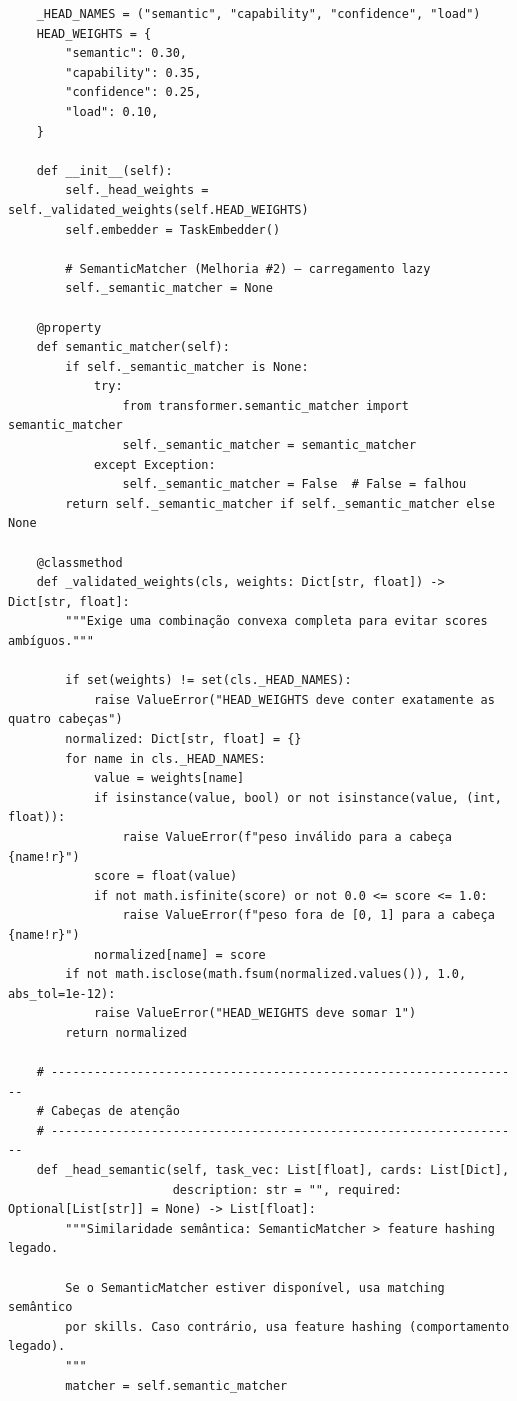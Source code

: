 \documentclass[12pt,openany,oneside,a4paper,brazil,chapter=TITLE]{abntex2}
\begin{document}
\begin{lstlisting}
    _HEAD_NAMES = ("semantic", "capability", "confidence", "load")
    HEAD_WEIGHTS = {
        "semantic": 0.30,
        "capability": 0.35,
        "confidence": 0.25,
        "load": 0.10,
    }

    def __init__(self):
        self._head_weights = self._validated_weights(self.HEAD_WEIGHTS)
        self.embedder = TaskEmbedder()

        # SemanticMatcher (Melhoria #2) — carregamento lazy
        self._semantic_matcher = None

    @property
    def semantic_matcher(self):
        if self._semantic_matcher is None:
            try:
                from transformer.semantic_matcher import semantic_matcher
                self._semantic_matcher = semantic_matcher
            except Exception:
                self._semantic_matcher = False  # False = falhou
        return self._semantic_matcher if self._semantic_matcher else None

    @classmethod
    def _validated_weights(cls, weights: Dict[str, float]) -> Dict[str, float]:
        """Exige uma combinação convexa completa para evitar scores ambíguos."""

        if set(weights) != set(cls._HEAD_NAMES):
            raise ValueError("HEAD_WEIGHTS deve conter exatamente as quatro cabeças")
        normalized: Dict[str, float] = {}
        for name in cls._HEAD_NAMES:
            value = weights[name]
            if isinstance(value, bool) or not isinstance(value, (int, float)):
                raise ValueError(f"peso inválido para a cabeça {name!r}")
            score = float(value)
            if not math.isfinite(score) or not 0.0 <= score <= 1.0:
                raise ValueError(f"peso fora de [0, 1] para a cabeça {name!r}")
            normalized[name] = score
        if not math.isclose(math.fsum(normalized.values()), 1.0, abs_tol=1e-12):
            raise ValueError("HEAD_WEIGHTS deve somar 1")
        return normalized

    # ------------------------------------------------------------------
    # Cabeças de atenção
    # ------------------------------------------------------------------
    def _head_semantic(self, task_vec: List[float], cards: List[Dict],
                       description: str = "", required: Optional[List[str]] = None) -> List[float]:
        """Similaridade semântica: SemanticMatcher > feature hashing legado.

        Se o SemanticMatcher estiver disponível, usa matching semântico
        por skills. Caso contrário, usa feature hashing (comportamento legado).
        """
        matcher = self.semantic_matcher


\end{lstlisting}
\end{document}
